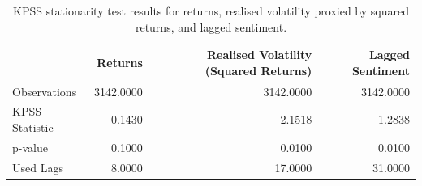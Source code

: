 \begin{table}
\caption{KPSS stationarity test results for returns, realised volatility proxied by squared returns, and lagged sentiment.}
\label{tab:kpss}
\begin{tabular}{lrrr}
\toprule
 & Returns & Realised Volatility (Squared Returns) & Lagged Sentiment \\
\midrule
Observations & 3142.0000 & 3142.0000 & 3142.0000 \\
KPSS Statistic & 0.1430 & 2.1518 & 1.2838 \\
p-value & 0.1000 & 0.0100 & 0.0100 \\
Used Lags & 8.0000 & 17.0000 & 31.0000 \\
\bottomrule
\end{tabular}
\end{table}
